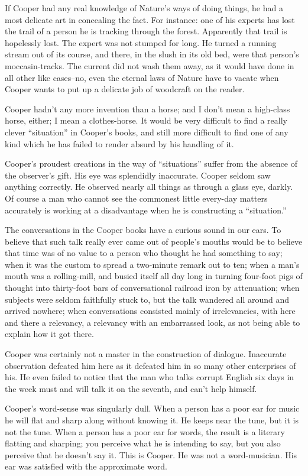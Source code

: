 \documentclass[../../demo.tex]{novelettesubdoc}
\begin{document}
If Cooper had any real knowledge of Nature's ways of doing
things, he had a most delicate art in concealing the fact. For instance:
one of his experts has lost the trail of a person he is tracking through the
forest. Apparently that trail is hopelessly lost. The expert was not stumped
for long. He turned a running
stream out of its course, and there, in the slush in its old bed, were
that person's moccasin-tracks. The current did not wash them away, as
it would have done in all other like cases--no, even the eternal laws
of Nature have to vacate when Cooper wants to put up a delicate job of
woodcraft on the reader.

Cooper hadn't any more invention than a horse; and I don't mean a
high-class horse, either; I mean a clothes-horse.
It would be very difficult to find a really clever ``situation'' in Cooper's
books, and still more difficult to find one of any kind which he has failed to
render absurd by his handling of it.

Cooper's proudest creations in the way of ``situations'' suffer
from the absence of the observer's gift. His eye was
splendidly inaccurate. Cooper seldom saw anything correctly. He observed
nearly all things as through a glass eye, darkly. Of course a man who
cannot see the commonest little every-day matters accurately is
working at a disadvantage when he is constructing a ``situation.''

The conversations in the Cooper books have a curious sound in our
ears. To believe that such talk really ever came out of people's mouths
would be to believe that time was of no value to
a person who thought he had something to say; when it was the custom
to spread a two-minute remark out to ten; when a man's mouth was a
rolling-mill, and busied itself all day long in turning four-foot pigs
of thought into thirty-foot bars of conversational railroad iron by
attenuation; when subjects were seldom faithfully stuck to, but the talk
wandered all around and arrived nowhere; when conversations consisted
mainly of irrelevancies, with here and there a relevancy, a relevancy
with an embarrassed look, as not being able to explain how it got there.

Cooper was certainly not a master in the construction of dialogue.
Inaccurate observation defeated him here as it defeated him in so many
other enterprises of his. He even failed to notice that the man who
talks corrupt English six days in the week must and will talk it on
the seventh, and can't help himself.

Cooper's word-sense was singularly dull. When a person has a poor ear
for music he will flat and sharp along without knowing it.
He keeps near the tune, but it is not the tune. When a person has a poor
ear for words, the result is a literary flatting and sharping; you
perceive what he is intending to say, but you also perceive that he
doesn't say it. This is Cooper. He was not a word-musician. His ear was
satisfied with the approximate word.
\end{document}
